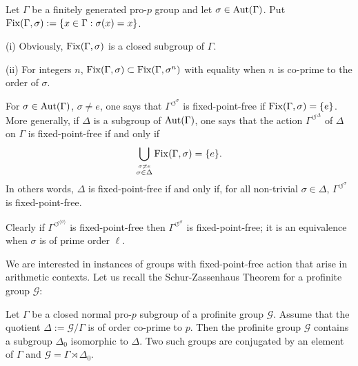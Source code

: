 \documentclass[12pt,a4paper,twoside,english]{smfart}
\def\G{{\mathcal G}}
\def\Aut{{\rm Aut}}
\def\Fix{{\rm Fix}}
\def\ACT#1#2{{\displaystyle{#1^{\circlearrowleft^#2}}}}
\def\act#1{{\displaystyle{#1^{\circlearrowleft^\sigma}}}}
\begin{document}
   
 
  \begin{defi}
  Let   $\Gamma$ be a finitely generated pro-$p$ group and  let $\sigma \in \Aut(\Gamma)$. Put $\Fix(\Gamma,\sigma):=\{x \in \Gamma : \sigma(x)=x\}$.
  \end{defi}

\begin{rema} \label{primetop}
(i) Obviously,   $\Fix(\Gamma,\sigma)$ is a closed subgroup of $\Gamma$.


(ii) For integers $n$,  $\Fix(\Gamma,\sigma) \subset \Fix(\Gamma,\sigma^n)$ with equality when $n$ is co-prime to the order of $\sigma$.  \end{rema}


  \begin{defi}
  For $\sigma\in \Aut(\Gamma)$, $\sigma \neq e$, one says that  $\act{\Gamma}$ is fixed-point-free if $\Fix(\Gamma,\sigma)=\{e\}$.
   More generally, if $\Delta$ is a subgroup of $\Aut(\Gamma)$, one says that the action $\ACT{\Gamma}{\Delta}$ of $\Delta$ on $\Gamma$ is fixed-point-free if and only if 
   $$\bigcup_{\stackrel{\sigma\neq e}{\sigma \in \Delta}} \Fix(\Gamma,\sigma)=\{e\}.$$ 
   In others words, $\Delta$ is fixed-point-free if and only if, for all non-trivial $\sigma\in \Delta$, $\act{\Gamma}$ is fixed-point-free.
    \end{defi}
 
 
 \begin{rema}
Clearly if $\ACT{\Gamma}{{\langle \sigma \rangle}}$ is fixed-point-free then $\act{\Gamma}$ is fixed-point-free; it is an equivalence when $\sigma$ is of prime order $\ell$.
 \end{rema}
 
We are  interested in instances of groups with fixed-point-free action that arise in arithmetic contexts.  
 Let us recall the Schur-Zassenhaus Theorem for a profinite group $\G$:
 
  \begin{theo} \label{Schur-Zassenhaus}
Let $\Gamma$ be a closed normal pro-$p$ subgroup  of a profinite group $\G$. Assume that  the quotient $\Delta:=\G/\Gamma$ is of order co-prime  to $p$.
Then the profinite group $\G$ contains a subgroup $\Delta_0$ isomorphic to $\Delta$. Two such groups are conjugated  by an element of $\Gamma$ and 
$\G=\Gamma \rtimes \Delta_0$. 
\end{theo}
  
\end{document}
